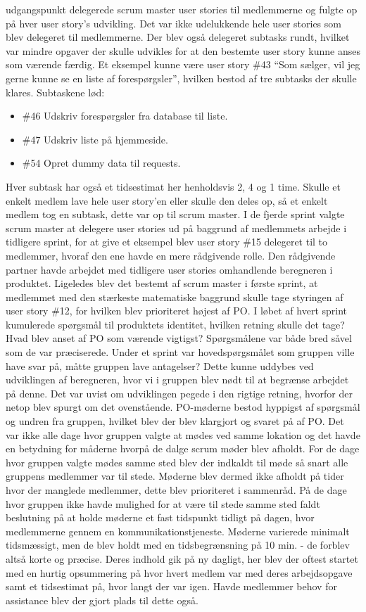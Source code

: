 \documentclass[11pt]{report}
\begin{document}
udgangspunkt delegerede scrum master user stories til medlemmerne og
fulgte op på hver user story’s udvikling. Det var ikke udelukkende
hele user stories som blev delegeret til medlemmerne. Der blev også
delegeret subtasks rundt, hvilket var mindre opgaver der skulle
udvikles for at den bestemte user story kunne anses som værende
færdig. Et eksempel kunne være user story \#43 “Som sælger, vil jeg
gerne kunne se en liste af forespørgsler”, hvilken bestod af tre
subtasks der skulle klares. \newpage
\noindent Subtaskene lød:
\begin{itemize}
\renewcommand\labelitemi{--}
\item \#46 Udskriv forespørgsler fra database til liste.
\item \#47 Udskriv liste på hjemmeside.
\item \#54 Opret dummy data til requests.
\end{itemize}
Hver subtask har også et tidsestimat her henholdsvis 2, 4 og 1 time. Skulle et enkelt medlem lave hele user story’en eller skulle den deles op, så et enkelt medlem tog en subtask, dette var op til scrum master.
I de fjerde sprint valgte scrum master at delegere user stories ud på baggrund af medlemmets arbejde i tidligere sprint, for at give et eksempel blev user story \#15 delegeret til to medlemmer, hvoraf den ene havde en mere rådgivende rolle. Den rådgivende partner havde arbejdet med tidligere user stories omhandlende beregneren i produktet.
Ligeledes blev det bestemt af scrum master i første sprint, at medlemmet med den stærkeste matematiske baggrund skulle tage styringen af user story \#12, for hvilken blev prioriteret højest af PO.
I løbet af hvert sprint kumulerede spørgsmål til produktets identitet, hvilken retning skulle det tage? Hvad blev anset af PO som værende vigtigst?
Spørgsmålene var både bred såvel som de var præciserede. Under et sprint var hovedspørgsmålet som gruppen ville have svar på, måtte gruppen lave antagelser? Dette kunne uddybes ved udviklingen af beregneren, hvor vi i gruppen blev nødt til at begrænse arbejdet på denne. Det var uvist om udviklingen pegede i den rigtige retning, hvorfor der netop blev spurgt om det ovenstående. PO-møderne bestod hyppigst af spørgsmål og undren fra gruppen, hvilket blev der blev klargjort og svaret på af PO.
Det var ikke alle dage hvor gruppen valgte at mødes ved samme lokation og det havde en betydning for måderne hvorpå de dalge scrum møder blev afholdt. For de dage hvor gruppen valgte mødes samme sted blev der indkaldt til møde så snart alle gruppens medlemmer var til stede. Møderne blev dermed ikke afholdt på tider hvor der manglede medlemmer, dette blev prioriteret i sammenråd. På de dage hvor gruppen ikke havde mulighed for at være til stede samme sted faldt beslutning på at holde møderne et fast tidspunkt tidligt på dagen, hvor medlemmerne gennem en kommunikationstjeneste. Møderne varierede minimalt tidsmæssigt, men de blev holdt med en tidsbegrænsning på 10 min. - de forblev altså korte og præcise. Deres indhold gik på ny dagligt, her blev der oftest startet med en hurtig opsummering på hvor hvert medlem var med deres arbejdsopgave samt et tidsestimat på, hvor langt der var igen. Havde medlemmer behov for assistance blev der gjort plads til dette også.
\end{document}
